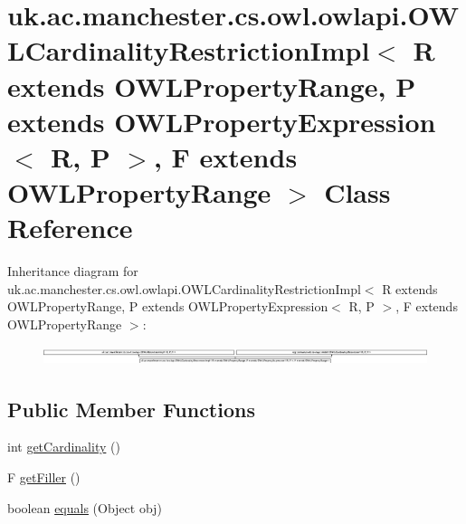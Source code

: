 \hypertarget{classuk_1_1ac_1_1manchester_1_1cs_1_1owl_1_1owlapi_1_1_o_w_l_cardinality_restriction_impl_3_01_r3eca1cd75ac91fcd50a6c201d3538b9b}{\section{uk.\-ac.\-manchester.\-cs.\-owl.\-owlapi.\-O\-W\-L\-Cardinality\-Restriction\-Impl$<$ R extends O\-W\-L\-Property\-Range, P extends O\-W\-L\-Property\-Expression$<$ R, P $>$, F extends O\-W\-L\-Property\-Range $>$ Class Reference}
\label{classuk_1_1ac_1_1manchester_1_1cs_1_1owl_1_1owlapi_1_1_o_w_l_cardinality_restriction_impl_3_01_r3eca1cd75ac91fcd50a6c201d3538b9b}
}
Inheritance diagram for uk.\-ac.\-manchester.\-cs.\-owl.\-owlapi.\-O\-W\-L\-Cardinality\-Restriction\-Impl$<$ R extends O\-W\-L\-Property\-Range, P extends O\-W\-L\-Property\-Expression$<$ R, P $>$, F extends O\-W\-L\-Property\-Range $>$\-:\begin{figure}[H]
\begin{center}
\leavevmode
\includegraphics[height=0.552813cm]{classuk_1_1ac_1_1manchester_1_1cs_1_1owl_1_1owlapi_1_1_o_w_l_cardinality_restriction_impl_3_01_r3eca1cd75ac91fcd50a6c201d3538b9b}
\end{center}
\end{figure}
\subsection*{Public Member Functions}
\begin{DoxyCompactItemize}
\item 
int \hyperlink{classuk_1_1ac_1_1manchester_1_1cs_1_1owl_1_1owlapi_1_1_o_w_l_cardinality_restriction_impl_3_01_r3eca1cd75ac91fcd50a6c201d3538b9b_a4fd7aba7c9bb42f62a9dc45455be6f03}{get\-Cardinality} ()
\item 
F \hyperlink{classuk_1_1ac_1_1manchester_1_1cs_1_1owl_1_1owlapi_1_1_o_w_l_cardinality_restriction_impl_3_01_r3eca1cd75ac91fcd50a6c201d3538b9b_acac426591886941f7dc7a4a7b57008f9}{get\-Filler} ()
\item 
boolean \hyperlink{classuk_1_1ac_1_1manchester_1_1cs_1_1owl_1_1owlapi_1_1_o_w_l_cardinality_restriction_impl_3_01_r3eca1cd75ac91fcd50a6c201d3538b9b_ac42789e0aea142919933f31e6756993f}{equals} (Object obj)
\end{DoxyCompactItemize}
